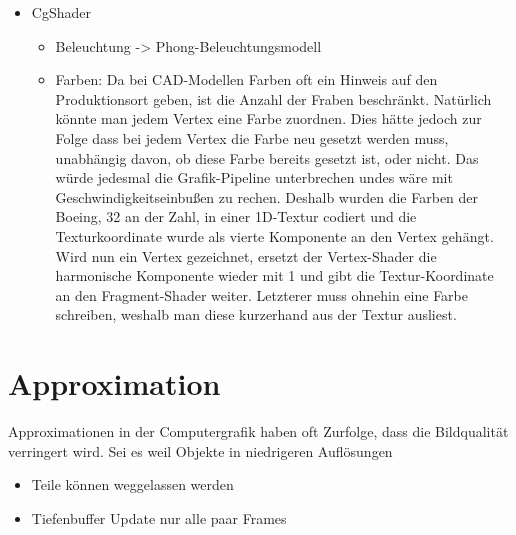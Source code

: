 \begin{itemize}
 \item CgShader
 \begin{itemize}
  \item Beleuchtung -> Phong-Beleuchtungsmodell \cite{cgtutorial}
  \item Farben: Da bei CAD-Modellen Farben oft ein Hinweis auf den Produktionsort geben, ist die Anzahl der Fraben beschränkt. Natürlich könnte man jedem Vertex eine Farbe zuordnen. Dies hätte jedoch zur Folge dass bei jedem Vertex die Farbe neu gesetzt werden muss, unabhängig davon, ob diese Farbe bereits gesetzt ist, oder nicht. Das würde jedesmal die Grafik-Pipeline unterbrechen undes wäre mit Geschwindigkeitseinbußen zu rechen. Deshalb wurden die Farben der Boeing, 32 an der Zahl, in einer 1D-Textur codiert und die Texturkoordinate wurde als vierte Komponente an den Vertex gehängt. Wird nun ein Vertex gezeichnet, ersetzt der Vertex-Shader die harmonische Komponente wieder mit 1 und gibt die Textur-Koordinate an den Fragment-Shader weiter. Letzterer muss ohnehin eine Farbe schreiben, weshalb man diese kurzerhand aus der Textur ausliest.
 \end{itemize}

\end{itemize}

\section{Approximation}
\label{sec:basics:approximation}
Approximationen in der Computergrafik haben oft  Zurfolge, dass die Bildqualität verringert wird. Sei es weil Objekte in niedrigeren Auflösungen
\begin{itemize}
 \item Teile können weggelassen werden
 \item Tiefenbuffer Update nur alle paar Frames
\end{itemize}

